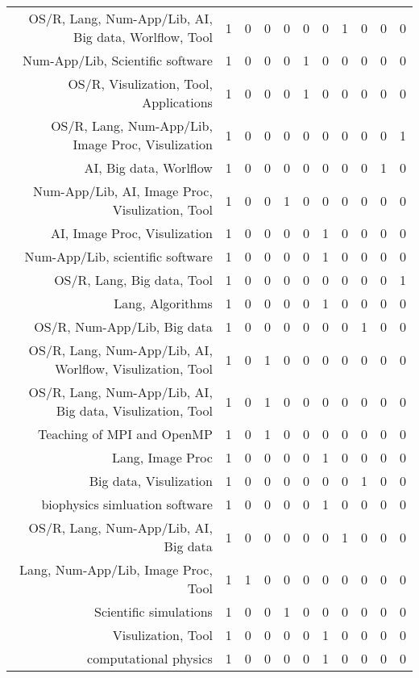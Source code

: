 {\begin{landscape}
\begin{longtable}[htb]{r|c|c|c|c|c|c|c|c|c|c}
{OS/R, Lang, Num-App/Lib, AI, Big data, Worlflow, Tool} & 1 & 0 & 0 & 0 & 0 & 0 & 1 & 0 & 0 & 0 \\%
{Num-App/Lib, Scientific software} & 1 & 0 & 0 & 0 & 1 & 0 & 0 & 0 & 0 & 0 \\%
{OS/R, Visulization, Tool, Applications} & 1 & 0 & 0 & 0 & 1 & 0 & 0 & 0 & 0 & 0 \\%
{OS/R, Lang, Num-App/Lib, Image Proc, Visulization} & 1 & 0 & 0 & 0 & 0 & 0 & 0 & 0 & 0 & 1 \\%
{AI, Big data, Worlflow} & 1 & 0 & 0 & 0 & 0 & 0 & 0 & 0 & 1 & 0 \\%
{Num-App/Lib, AI, Image Proc, Visulization, Tool} & 1 & 0 & 0 & 1 & 0 & 0 & 0 & 0 & 0 & 0 \\%
{AI, Image Proc, Visulization} & 1 & 0 & 0 & 0 & 0 & 1 & 0 & 0 & 0 & 0 \\%
{Num-App/Lib, scientific software} & 1 & 0 & 0 & 0 & 0 & 1 & 0 & 0 & 0 & 0 \\%
{OS/R, Lang, Big data, Tool} & 1 & 0 & 0 & 0 & 0 & 0 & 0 & 0 & 0 & 1 \\%
{Lang, Algorithms} & 1 & 0 & 0 & 0 & 0 & 1 & 0 & 0 & 0 & 0 \\%
{OS/R, Num-App/Lib, Big data} & 1 & 0 & 0 & 0 & 0 & 0 & 0 & 1 & 0 & 0 \\%
{OS/R, Lang, Num-App/Lib, AI, Worlflow, Visulization, Tool} & 1 & 0 & 1 & 0 & 0 & 0 & 0 & 0 & 0 & 0 \\%
{OS/R, Lang, Num-App/Lib, AI, Big data, Visulization, Tool} & 1 & 0 & 1 & 0 & 0 & 0 & 0 & 0 & 0 & 0 \\%
{Teaching of MPI and OpenMP} & 1 & 0 & 1 & 0 & 0 & 0 & 0 & 0 & 0 & 0 \\%
{Lang, Image Proc} & 1 & 0 & 0 & 0 & 0 & 1 & 0 & 0 & 0 & 0 \\%
{Big data, Visulization} & 1 & 0 & 0 & 0 & 0 & 0 & 0 & 1 & 0 & 0 \\%
{biophysics simluation software} & 1 & 0 & 0 & 0 & 0 & 1 & 0 & 0 & 0 & 0 \\%
{OS/R, Lang, Num-App/Lib, AI, Big data} & 1 & 0 & 0 & 0 & 0 & 0 & 1 & 0 & 0 & 0 \\%
{Lang, Num-App/Lib, Image Proc, Tool} & 1 & 1 & 0 & 0 & 0 & 0 & 0 & 0 & 0 & 0 \\%
{Scientific simulations} & 1 & 0 & 0 & 1 & 0 & 0 & 0 & 0 & 0 & 0 \\%
{Visulization, Tool} & 1 & 0 & 0 & 0 & 0 & 1 & 0 & 0 & 0 & 0 \\%
{computational physics} & 1 & 0 & 0 & 0 & 0 & 1 & 0 & 0 & 0 & 0 \\%

\end{longtable}
\end{landscape}}

